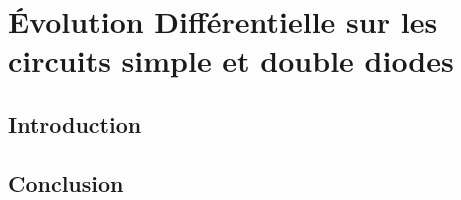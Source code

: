 \chapter{Évolution Différentielle sur les circuits simple et double diodes}

\section{Introduction}

\section{Conclusion}

